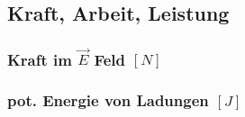 \subsection{Kraft, Arbeit, Leistung}
    \subsubsection{Kraft im $\vec{E}$ Feld \hfill $[N]$}
    
    \subsubsection{pot. Energie von Ladungen \hfill $[J]$}
    

